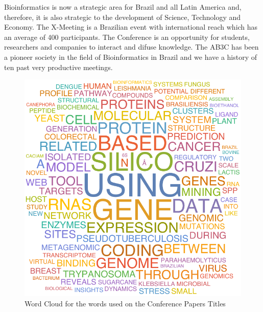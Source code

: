 	
Bioinformatics is now a strategic area for Brazil and all Latin America and,
therefore, it is also strategic to the development of Science, Technology and
Economy. The X-Meeting is a Brazilian event with international reach which has
an average of 400 participants. The Conference is an opportunity for students,
researchers and companies to interact and difuse knowledge. The AB3C has been a
pioneer society in the field of Bioinformatics in Brazil and we have a history
of ten past very productive meetings.

\begin{figure}[h]
    \begin{center}
  \includegraphics[scale=0.7]{wordcloud}
\end{center}
\caption{Word Cloud for the words used on the Conference Papers Titles}
\end{figure}